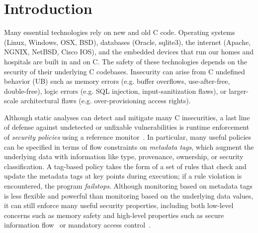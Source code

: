 \section{Introduction}

Many essential technologies rely on new and old C code.
Operating systems (Linux, Windows, OSX, BSD), databases (Oracle, sqlite3), the internet
(Apache, NGNIX, NetBSD, Cisco IOS), and the 
embedded devices that run our homes and hospitals are built in and on C. %
The safety of these technologies
depends on the security of their underlying C codebases.
Insecurity can arise from C
undefined behavior (UB) such as memory errors (e.g. buffer overflows, use-after-free, double-free),
logic errors (e.g. SQL injection, input-sanitization flaws), or
larger-scale architectural flaws (e.g. over-provisioning access rights).

Although static analyses can detect and mitigate many C insecurities, a last line of
defense against undetected or unfixable vulnerabilities is runtime
enforcement of {\em security policies} using a reference
monitor~\cite{Anderson72:PlanningStudy}. In particular, 
many useful policies can be specified in terms of flow constraints on 
\emph{metadata tags}, which augment the underlying data with information like type, provenance,
ownership, or security classification. A tag-based policy takes the form of a set of
rules that check and update the metadata tags at key points during execution; if a rule violation is
encountered, the program \emph{failstops}. 
Although monitoring based on metadata tags is less flexible and powerful than monitoring based on the
underlying data values, it can still enforce many useful security properties, including
both low-level concerns such as memory safety %
and high-level properties such as secure information flow~\cite{Denning76:SFIlattice} or
mandatory access control~\cite{Lampson74:Protection}.

